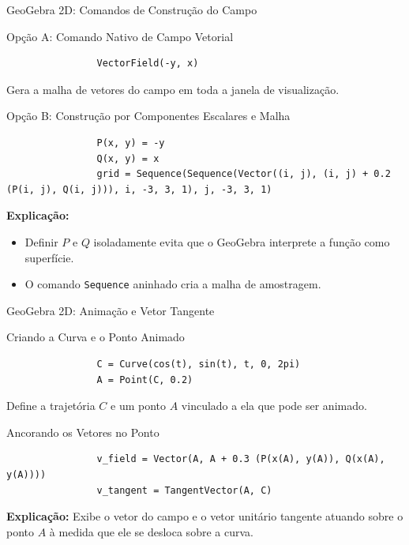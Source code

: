 \documentclass[aspectratio=169, 13pt]{beamer}
\begin{document}
	\begin{frame}[fragile]{GeoGebra 2D: Comandos de Construção do Campo}
		\begin{block}{Opção A: Comando Nativo de Campo Vetorial}
			\begin{lstlisting}
				VectorField(-y, x)
			\end{lstlisting}
			Gera a malha de vetores do campo em toda a janela de visualização.
		\end{block}
		
		\begin{block}{Opção B: Construção por Componentes Escalares e Malha}
			\begin{lstlisting}
				P(x, y) = -y
				Q(x, y) = x
				grid = Sequence(Sequence(Vector((i, j), (i, j) + 0.2 (P(i, j), Q(i, j))), i, -3, 3, 1), j, -3, 3, 1)
			\end{lstlisting}
			\textbf{Explicação:}
			\begin{itemize}
				\item Definir $P$ e $Q$ isoladamente evita que o GeoGebra interprete a função como superfície.
				\item O comando \texttt{Sequence} aninhado cria a malha de amostragem.
			\end{itemize}
		\end{block}
	\end{frame}
	
	\begin{frame}[fragile]{GeoGebra 2D: Animação e Vetor Tangente}
		\begin{block}{Criando a Curva e o Ponto Animado}
			\begin{lstlisting}
				C = Curve(cos(t), sin(t), t, 0, 2pi)
				A = Point(C, 0.2)
			\end{lstlisting}
			Define a trajetória $C$ e um ponto $A$ vinculado a ela que pode ser animado.
		\end{block}
		
		\begin{block}{Ancorando os Vetores no Ponto}
			\begin{lstlisting}
				v_field = Vector(A, A + 0.3 (P(x(A), y(A)), Q(x(A), y(A))))
				v_tangent = TangentVector(A, C)
			\end{lstlisting}
			\textbf{Explicação:} Exibe o vetor do campo e o vetor unitário tangente atuando sobre o ponto $A$ à medida que ele se desloca sobre a curva.
		\end{block}
	\end{frame}
	
\end{document}
